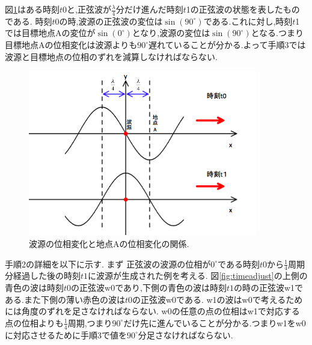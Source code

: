 図\ref{fig:tezyun1}はある時刻$t$0と,正弦波が$\frac{\lambda}{4}$分だけ進んだ時刻$t$1の正弦波の状態を表したものである.
時刻$t$0の時,波源の正弦波の変位は$\sin(90^{\circ})$である.これに対し,時刻$t$1では目標地点Aの変位が$\sin(0^{\circ})$となり,波源の変位は$\sin(90^{\circ})$となる.つまり目標地点Aの位相変化は波源よりも$90^{\circ}$遅れていることが分かる.よって手順3では波源と目標地点の位相のずれを減算しなければならない.

\begin{figure}[htbp]
 \begin{center}
  \includegraphics[width=100mm]{../background/tezyun1.png}
 \end{center}
 \caption{波源の位相変化と地点Aの位相変化の関係.}
 \label{fig:tezyun1}
\end{figure}

\newpage


手順2の詳細を以下に示す.
まず
正弦波の波源の位相が$0^{\circ}$である時刻$t0$から$\frac{1}{4}$周期分経過した後の時刻$t1$に波源が生成された例を考える.
図\ref{fig:timeadjust}の上側の青色の波は時刻$t0$の正弦波w0であり,下側の青色の波は時刻$t1$の時の正弦波w1である.また下側の薄い赤色の波は$t0$の正弦波w0である.
w1の波はw0で考えるためには角度のずれを足さなければならない.
w0の任意の点の位相はw1で対応する点の位相よりも$\frac{1}{4}$周期,つまり$90^{\circ}$だけ先に進んでいることが分かる.つまりw1をw0に対応させるために手順3で値を$90^{\circ}$分足さなければならない.



